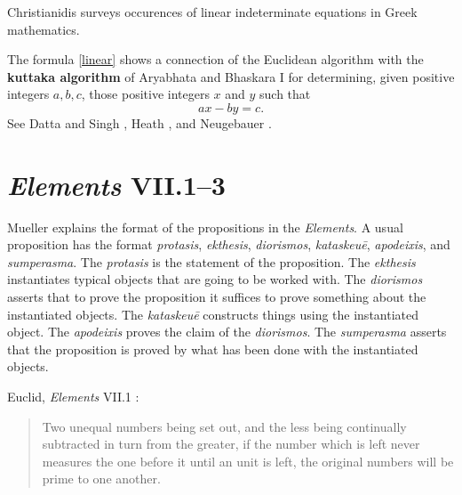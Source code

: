 \documentclass{article}
\begin{document}
Christianidis \cite{christianidis} surveys occurences of linear indeterminate equations in Greek mathematics.

The formula \eqref{linear} shows a connection of the Euclidean algorithm with
the \textbf{kuttaka algorithm} of 
Aryabhata and Bhaskara I for determining, given positive integers $a,b,c$, those positive integers $x$ and $y$ such
that
\[
ax-by=c.
\]
See Datta and Singh \cite[II, pp.~87--125, \S 13]{hindu}, Heath \cite[pp.~281--285]{diophantus},
and Neugebauer \cite[pp.~1117--1120, VI C 4, 2]{neugebauer}.






\section{{\em Elements} VII.1--3}
Mueller \cite[p.~11]{mueller} explains the format of the propositions in the {\em Elements}.
A usual proposition has
the format 
{\em protasis}, {\em ekthesis}, {\em diorismos}, {\em kataskeu\={e}}, {\em apodeixis}, and {\em sumperasma}.
The {\em protasis} is the statement of the proposition. The {\em ekthesis} instantiates typical objects that are going to be worked with.
The {\em diorismos} asserts that to prove the proposition it suffices to prove something about the instantiated objects.
The {\em kataskeu\={e}} constructs things using the instantiated object. The {\em apodeixis} proves
the claim of the {\em diorismos}. The {\em sumperasma} asserts that the proposition is proved by what has been done with the instantiated objects.



Euclid, {\em Elements} VII.1 \cite[p.~296]{euclidII}:

\begin{quote}
Two unequal numbers being set out, and the less being
continually subtracted in turn from the greater, if the number
which is left never measures the one before it until an unit is
left, the original numbers will be prime to one another.
\end{quote}
\end{document}
